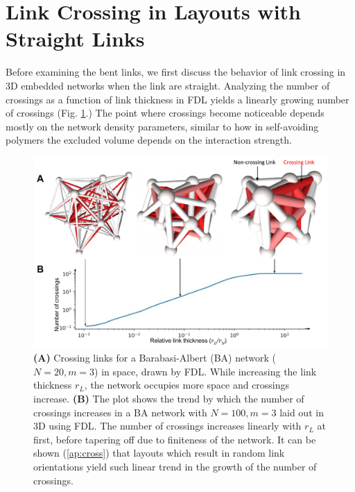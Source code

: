 \documentclass[endfloats,nofootinbib,preprint,floatfix,titlepage,superscriptaddress]{revtex4} %
\newcommand{\outNim}[1]{}
\begin{document}
\section{Link Crossing in Layouts with Straight Links \label{ap:cross}}
Before examining the bent links, we first discuss the behavior of link crossing in 3D embedded networks when the link are straight. 
Analyzing the number of crossings as a function of link thickness in FDL yields a linearly growing number of crossings
\outNim{
\footnote{The exact properties of the point where the crossings start is not our primary concern here, but it seems to start at a certain nonzero thickness. 
This sharp phase transition is actually a feature of these connected networks with FDL. 
The transition disappears, as expected, in a system of randomly oriented disconnected links in 3D. 
The length scale at which this phase transition occurs is a function of some dimensionful parameter that can naturally arise from the difference in the form of the repulsive node forces and the attractive forces on the links. We did experiment adding noise to the layout and also randomly switched links around. While these changes increased the slope of the line of the crossings (generally showing more crossings than FDL) they did {\em not} move the point of the phase transition appreciably.}
}(Fig. \ref{fig:crs}.) 
The point where crossings become noticeable depends mostly on the network density parameters, similar to how in self-avoiding polymers the excluded volume depends on the interaction strength. 
\begin{figure}
    \centering
    \includegraphics[width=.7\columnwidth]{fig-09-19/3D-cross.pdf}
    \caption{\scriptsize
    {\bf (A)}  Crossing links for a Barabasi-Albert (BA) network ($N = 20, m = 3$) in space, drawn by FDL. While increasing the link thickness $r_L$, the network occupies more space and crossings increase. 
    {\bf (B)} The plot shows the trend by which the number of crossings increases in a BA network with $N=100, m =3$ laid out in 3D using FDL.
    The number of crossings increases linearly with $r_L$ at first, before tapering off due to finiteness of the network. It can be shown (\ref{ap:cross}) that layouts which result in random link orientations yield such linear trend in the growth of the number of crossings.
    }     
    \label{fig:crs}
\end{figure}
\end{document}
